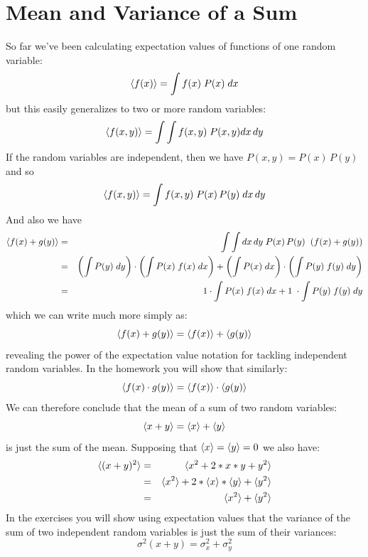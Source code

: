 \documentclass[12pt]{article}
\begin{document}
\section{Mean and Variance of a Sum}

So far we've been calculating expectation values of functions of one random variable: 
\begin{displaymath}
\braket{f(x)} = \int f(x) \; P(x) \; dx
\end{displaymath}
but this easily generalizes to two or more random variables:
\begin{displaymath}
\braket{f(x,y)} = \int \int f(x,y) \; P(x,y) dx \, dy 
\end{displaymath}
If the random variables are independent, then we have $P(x,y) = P(x) \, P(y)$ and so
\begin{displaymath}
\braket{f(x,y)} = \int f(x,y) \; P(x) \, P(y) \; dx \, dy
\end{displaymath}
And also we have
\begin{eqnarray*}
\braket{f(x)+g(y)} &=& \int \int dx \, dy \; P(x) \, P(y) \;\; (f(x) + g(y)) \\
&=& \left(\int P(y) \; dy \right) \cdot \left( \int P(x) \; f(x) \; dx  \right) 
+ \left(\int P(x) \; dx \right) \cdot \left( \int P(y) \; f(y) \; dy  \right)\\
&=& 1 \cdot \int P(x) \; f(x) \; dx  + 1 \; \cdot \int P(y) \; f(y) \; dy \\
\end{eqnarray*}
which we can write much more simply as:
\begin{displaymath}
\braket{f(x)+g(y)} = \braket{f(x)}+\braket{g(y)}
\end{displaymath}
revealing the power of the expectation value notation for tackling independent random variables.  In the homework you will show that similarly:
\begin{equation}
\braket{f(x) \cdot g(y)} = \braket{f(x)} \cdot \braket{g(y)} \label{eqn:expprod}
\end{equation}
We can therefore conclude that the mean of a sum of two random variables:
\begin{displaymath}
\braket{x + y} = \braket{x} + \braket{y} 
\end{displaymath}
is just the sum of the mean.  Supposing that $\braket{x} = \braket{y} = 0$ we also have:
\begin{eqnarray*}
\braket{(x + y)^2} &=& \braket{x^2 + 2*x*y + y^2} \\
&=& \braket{x^2} + 2*\braket{x}*\braket{y} + \braket{y^2} \\
&=& \braket{x^2} + \braket{y^2} \\
\end{eqnarray*}
In the exercises you will show using expectation values that the variance of the sum of two independent random variables is just the sum of their variances:
\begin{displaymath}
\sigma^2(x+y) = \sigma^2_x + \sigma^2_y
\end{displaymath}
\end{document}
